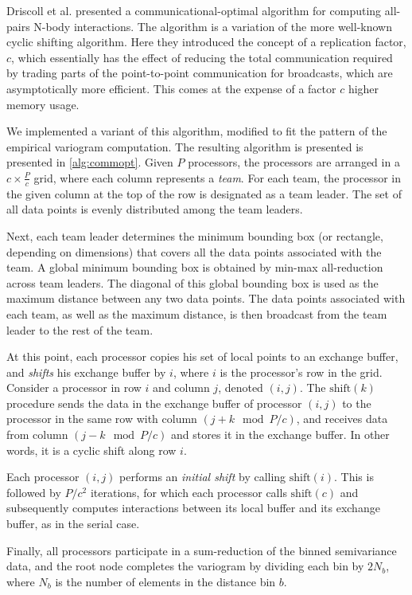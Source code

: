 Driscoll et al. \cite{Driscoll2013} presented a communicational-optimal algorithm for computing all-pairs N-body interactions. The algorithm is a variation of the more well-known cyclic shifting algorithm. Here they introduced the concept of a replication factor, $c$, which essentially has the effect of reducing the total communication required by trading parts of the point-to-point communication for broadcasts, which are asymptotically more efficient. This comes at the expense of a factor $c$ higher memory usage.

We implemented a variant of this algorithm, modified to fit the pattern of the empirical variogram computation. The resulting algorithm is presented is presented in \ref{alg:commopt}. Given $P$ processors, the processors are arranged in a $c \times \frac{P}{c}$ grid, where each column represents a \emph{team}. For each team, the processor in the given column at the top of the row is designated as a team leader. The set of all data points is evenly distributed among the team leaders. 

Next, each team leader determines the minimum bounding box (or rectangle, depending on dimensions) that covers all the data points associated with the team. A global minimum bounding box is obtained by min-max all-reduction across team leaders. The diagonal of this global bounding box is used as the maximum distance between any two data points. The data points associated with each team, as well as the maximum distance, is then broadcast from the team leader to the rest of the team. 

At this point, each processor copies his set of local points to an exchange buffer, and \emph{shifts} his exchange buffer by $i$, where $i$ is the processor's row in the grid. Consider a processor in row $i$ and column $j$, denoted $(i, j)$. The $\text{shift}(k)$ procedure sends the data in the exchange buffer of processor $(i, j)$ to the processor in the same row with column $(j + k \mod P / c)$, and receives data from column $(j - k \mod P / c)$ and stores it in the exchange buffer. In other words, it is a cyclic shift along row $i$. 

Each processor $(i, j)$ performs an \emph{initial shift} by calling $\text{shift}(i)$. This is followed by $P / c^2$ iterations, for which each processor calls $\text{shift}(c)$ and subsequently computes interactions between its local buffer and its exchange buffer, as in the serial case.

Finally, all processors participate in a sum-reduction of the binned semivariance data, and the root node completes the variogram by dividing each bin by $2 N_b$, where $N_b$ is the number of elements in the distance bin $b$.

